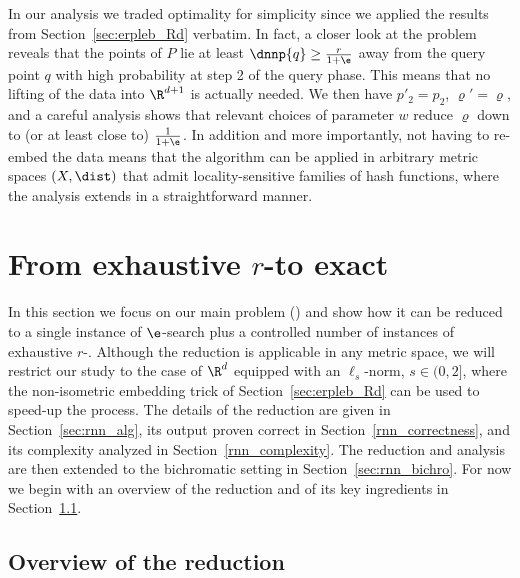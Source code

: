 \begin{remark}\label{rem:exact-NN_general}
In our analysis we traded optimality for simplicity since we applied
the results from Section~\ref{sec:erpleb_Rd} verbatim. In fact, a
closer look at the problem reveals that the points of $P$ lie at least
$\dnnp{q}\geq \frac{r}{1+\e}$ away from the query point $q$ with high
probability at step 2 of the query phase. This means that no
lifting of the data into $\R^{d+1}$ is actually needed. We then
have $p'_2=p_2$, $\varrho'=\varrho$, and a careful analysis shows that
relevant choices of parameter $w$ reduce $\varrho$ down to (or at
least close to) $\frac{1}{1+\e}$. In addition and more importantly,
not having to re-embed the data means that the algorithm can be
applied in arbitrary metric spaces $(X,\dist)$ that admit
locality-sensitive families of hash functions, where the analysis
extends in a straightforward manner.
\end{remark}



\section{From exhaustive $r$-\pleb to exact \rnn}
\label{sec:rnn}

In this section we focus on our main problem (\rnn) and show how
it can be reduced to a single instance of $\e$-\nn search plus a
controlled number of instances of exhaustive $r$-\pleb. Although the
reduction is applicable in any metric space, we will restrict our
study to the case of $\R^d$ equipped with an $\ell_s$-norm, $s\in
(0,2]$, where the non-isometric embedding trick of
  Section~\ref{sec:erpleb_Rd} can be used to speed-up the process. The
  details of the reduction are given in Section~\ref{sec:rnn_alg}, its
  output proven correct in Section~\ref{rnn_correctness}, and its
  complexity analyzed in Section~\ref{rnn_complexity}. The reduction
  and analysis are then extended to the bichromatic setting in
  Section~\ref{sec:rnn_bichro}.  For now we begin with an overview of
  the reduction and of its key ingredients in
  Section~\ref{sec:rnn_overview}.


\subsection{Overview of the reduction}
\label{sec:rnn_overview}

